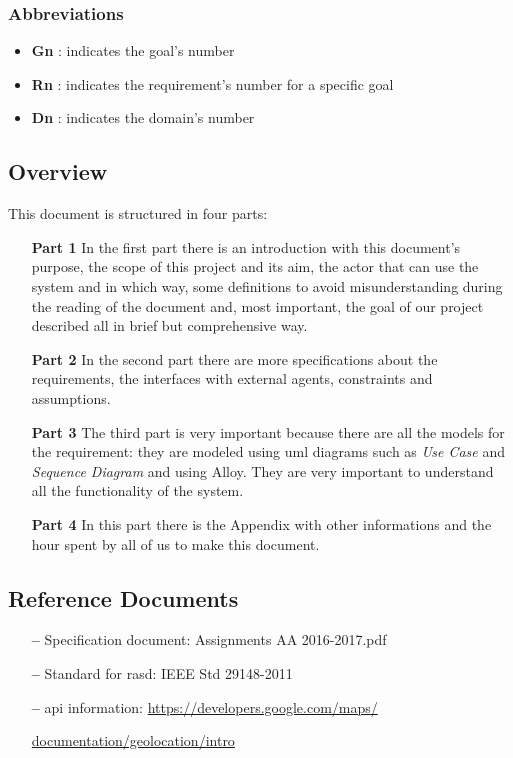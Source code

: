 \subsubsection{Abbreviations} \label{abbre}
\begin{itemize}
\item \textbf{Gn} : indicates the goal's number
\item \textbf{Rn} : indicates the requirement's number for a specific goal
\item \textbf{Dn} : indicates the domain's number
\end{itemize}


\subsection{Overview} \label{subsec:overview}
This document is structured in four parts:
\begin{itemize}
\item[\textbf{Part 1}]In the first part there is an introduction with this document's purpose, the scope of this project and its aim, the actor that can use  the system and in which way, some definitions to avoid misunderstanding during the reading of the document and, most important, the goal of our project described all in brief but comprehensive way.  
\item[\textbf{Part 2}]In the second part there are more specifications about the requirements, the interfaces with external agents, constraints and assumptions.
\item[\textbf{Part 3}]The third part is very important because there are all the models for the requirement: they are modeled using \acs{uml} diagrams such as \emph{Use Case} and \emph{Sequence Diagram} and using Alloy. They are very important to understand all the functionality of the system.  
\item[\textbf{Part 4}]In this part there is the Appendix with other informations and the hour spent by all of us to make this document.
\end{itemize}

\subsection{Reference Documents} \label{ref-doc}

\begin{itemize}
\item[\textbf{--}] Specification document: Assignments AA 2016-2017.pdf
\item[\textbf{--}] Standard for \acs{rasd}: IEEE Std 29148-2011
\item[\textbf{--}] \acs{api} information: 
\url{https://developers.google.com/maps/}

\url{documentation/geolocation/intro}

\end{itemize}



